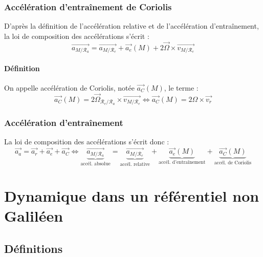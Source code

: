\documentclass[a4paper,10pt]{book} %
\begin{document}
\subsection{Accélération d'entraînement de Coriolis}
D'après la définition de l'accélération relative et de l'accélération d'entraînement, la loi de composition des accélérations s'écrit :
$$\overrightarrow{a_{M/\mathcal{R}_a}}=\overrightarrow{a_{M/\mathcal{R}_e}}+\overrightarrow{a_e}(M)+2\overrightarrow{\Omega}\times \overrightarrow{v_{M/\mathcal{R}_e}}$$

\subsubsection{Définition}
On appelle accélération de Coriolis, notée $\overrightarrow{a_C}(M)$, le terme :
$$\overrightarrow{a_C}(M)=2\overrightarrow{\Omega}_{\mathcal{R}_e/\mathcal{R}_a}\times \overrightarrow{v_{M/\mathcal{R}_e}}\Leftrightarrow\overrightarrow{a_C}(M)=2\Omega\times \overrightarrow{v_r}$$

\subsection{Accélération d'entraînement}
La loi de composition des accélérations s'écrit donc :
$$\overrightarrow{a_a}=\overrightarrow{a_r}+\overrightarrow{a_e}+\overrightarrow{a_C}\Leftrightarrow \underbrace{\overrightarrow{a_{M/\mathcal{R}_a}}}_{\text{accél. absolue}}=\underbrace{\overrightarrow{a_{M/\mathcal{R}_e}}}_{\text{accél. relative}}+ \underbrace{\overrightarrow{a_e}(M)}_{\text{accél. d'entraînement}} +\underbrace{\overrightarrow{a_C}(M)}_{\text{accél. de Coriolis}}$$







\chapter{Dynamique dans un référentiel non Galiléen}
\section{Définitions}
\end{document}
